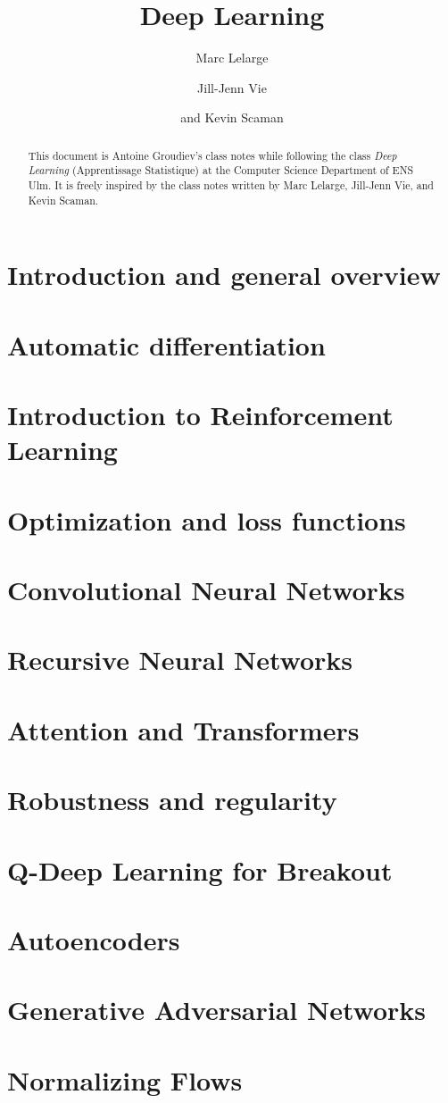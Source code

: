 \documentclass[toc, titlepaged]{../cs-classes/cs-classes}
\title{Deep Learning}
\author{Marc Lelarge\and Jill-Jenn Vie\and and Kevin Scaman}
\begin{document}
\begin{abstract}
    This document is Antoine Groudiev's class notes while following the class \emph{Deep Learning} (Apprentissage Statistique) at the Computer Science Department of ENS Ulm. It is freely inspired by the class notes written by Marc Lelarge, Jill-Jenn Vie, and Kevin Scaman. 
\end{abstract}

\section{Introduction and general overview}

\section{Automatic differentiation}

\section{Introduction to Reinforcement Learning}

\section{Optimization and loss functions}

\section{Convolutional Neural Networks}

\section{Recursive Neural Networks}

\section{Attention and Transformers}

\section{Robustness and regularity}

\section{Q-Deep Learning for Breakout}

\section{Autoencoders}

\section{Generative Adversarial Networks}

\section{Normalizing Flows}
\end{document}

